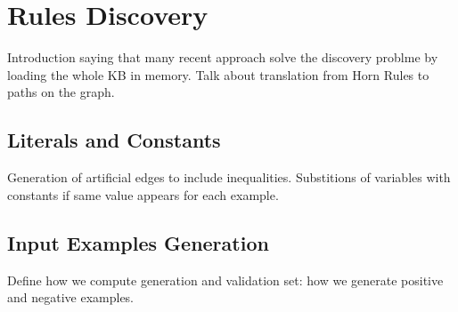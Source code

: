 \section{Rules Discovery}
Introduction saying that many recent approach solve the discovery problme by loading the whole KB in memory.
Talk about translation from Horn Rules to paths on the graph.


\subsection{Literals and Constants}
Generation of artificial edges to include inequalities.
Substitions of variables with constants if same value appears for each example.

\subsection{Input Examples Generation} \label{sec:examples_gen}
Define how we compute generation and validation set: how we generate positive and negative examples.